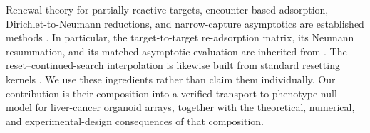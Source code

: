 \documentclass[pdflatex,sn-mathphys-num]{sn-jnl}
\numberwithin{equation}{section}
\theoremstyle{thmstyleone}%
\theoremstyle{definition}
\theoremstyle{remark}
\begin{document}
Renewal theory for partially reactive targets, encounter-based adsorption, Dirichlet-to-Neumann reductions, and narrow-capture asymptotics are established methods \cite{bressloff2025diffusion,bressloff2025asymptotic,
bressloff2026renewal,bressloff2022spectral,bressloff2025random,wang2026breakdown,
bressloff2021asymptotic,grebenkov2020diffusion}. In particular, the target-to-target re-adsorption matrix, its Neumann resummation, and its matched-asymptotic evaluation are inherited from
\cite{bressloff2025asymptotic}. The reset--continued-search interpolation is likewise built from standard resetting kernels \cite{kusmierz2014first,riascos2020random,gonzalez2021diffusive,yu2026rigorous,
janson2012hitting}. We use these ingredients rather than claim them individually. Our contribution is their composition into a verified transport-to-phenotype null model for liver-cancer organoid arrays, together with the theoretical, numerical, and experimental-design consequences of that composition.
\end{document}
